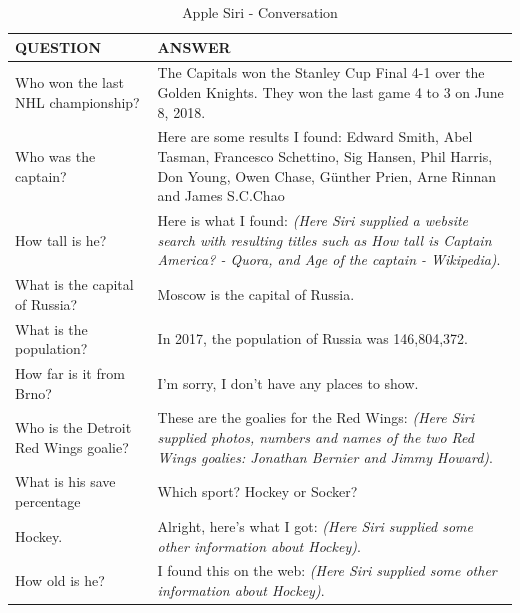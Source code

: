 \documentclass[
  digital, %
  oneside, %
  table,   %
  lof,     %
  lot,     %
]{fithesis3}
\begin{document}
\begin{table}[H]
    \begin{tabular}{ | p{6cm} | p{6cm} |} 
    \hline
    QUESTION & ANSWER \\
    \hline
    Who won the last NHL championship?
    & 
    The Capitals won the Stanley Cup Final 4-1 over the Golden Knights. They won the last game 4 to 3 on June 8, 2018.
    \\
    Who was the captain?
    &
    Here are some results I found: Edward Smith, Abel Tasman, Francesco Schettino, Sig Hansen, Phil Harris, Don Young, Owen Chase, Günther Prien, Arne Rinnan and James S.C.Chao
    \\
    How tall is he?
    &
    Here is what I found: \textit{(Here Siri supplied a website search with resulting titles such as How tall is Captain America? - Quora, and Age of the captain - Wikipedia)}.
    \\
    \hline
    What is the capital of Russia?
    &
    Moscow is the capital of Russia.
    \\
    What is the population?
    &
    In 2017, the population of Russia was 146,804,372.
    \\
    How far is it from Brno?
    & 
    I'm sorry, I don't have any places to show.
    \\
    \hline
    Who is the Detroit Red Wings goalie?
    &
    These are the goalies for the Red Wings: \textit{(Here Siri supplied photos, numbers and names of the two Red Wings goalies: Jonathan Bernier and Jimmy Howard)}.
    \\
    What is his save percentage
    &
    Which sport? Hockey or Socker?
    \\
    Hockey.
    &
    Alright, here's what I got: \textit{(Here Siri supplied some other information about Hockey)}.
    \\
    How old is he?
    & 
    I found this on the web: \textit{(Here Siri supplied some other information about Hockey)}.
    \\
    \hline
    \end{tabular}
    \caption{Apple Siri - Conversation}
    \label{tab:siri_conversation}
\end{table}
\end{document}
